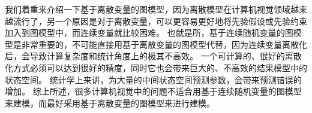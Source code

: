 我们着重来介绍一下基于离散变量的图模型，因为离散模型在计算机视觉领域越来越流行了，另一个原因是对于离散变量，可以更容易更好地将先验假设或先验约束加入到图模型中，而连续变量就比较困难。
也就是所，基于连续随机变量的图模型是非常重要的，不可能直接用基于离散变量的图模型代替，因为连续变量离散化后，会导致计算复杂度和统计角度上的极其不高效。
一个可计算的、很好的离散化方式必须可以达到很好的精度，同时它也会带来巨大的、不高效的结果模型中的状态空间。
统计学上来讲，为大量的中间状态空间预测参数，会带来预测错误的增加。
综上所述，很多计算机视觉中的问题不适合用基于连续随机变量的图模型来建模，而最好采用基于离散变量的图模型来进行建模。


\begin{figure}[tbp]
    \centering
    \label{fig:graphmodel}
\end{figure}


